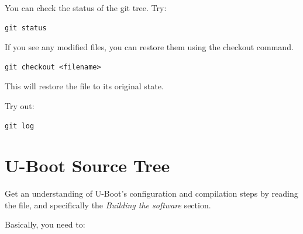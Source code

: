 You can check the status of the git tree. Try:
{\small
\begin{verbatim}
git status
\end{verbatim}
}

If you see any modified files, you can restore them using the checkout command.

{\small
\begin{verbatim}
git checkout <filename>
\end{verbatim}
}

This will restore the file to its original state.

Try out:
{\small
\begin{verbatim}
git log
\end{verbatim}
}

\clearpage
\section{U-Boot Source Tree}
Get an understanding of U-Boot's configuration and compilation steps by
reading the  file, and specifically the {\em Building the
  software} section.

Basically, you need to:

